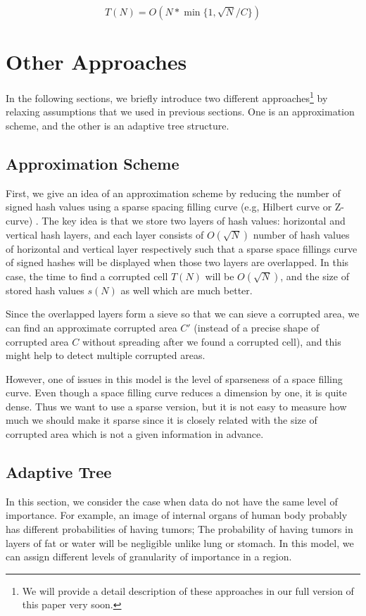 \documentclass{llncs}
\begin{document}
$$T(N) = O( N * \min \{ 1 , \sqrt{N}/C \} )$$

\section{Other Approaches}
\label{OtherApproaches}
In the following sections, we briefly introduce two different approaches\footnote{We will provide a detail description of these approaches in our full version of this paper very soon.} by relaxing assumptions that we used in previous sections.
One is an approximation scheme, and the other is an adaptive tree structure.

\subsection{Approximation Scheme}
First, we give an idea of an approximation scheme 
by reducing the number of signed hash values 
using a sparse spacing filling curve (e.g, Hilbert curve or Z-curve) \cite{LiJe00,OrMa98}.
The key idea is that we store two layers of hash values: horizontal and vertical hash layers,
and each layer consists of $O(\sqrt{N})$ number of hash values of horizontal and vertical layer
respectively such that a sparse space fillings curve of signed hashes will be displayed 
when those two layers are overlapped.
In this case, the time to find a corrupted cell $T(N)$ will be $O(\sqrt{N})$, 
and the size of stored hash values $s(N)$ as well which are much better. 

Since the overlapped layers form a sieve so that we can sieve a corrupted area,
we can find an approximate corrupted area $C'$ 
(instead of a precise shape of corrupted area $C$ 
without spreading after we found a corrupted cell),
and this might help to detect multiple corrupted areas.

However, one of issues in this model is the level of sparseness of a space filling curve.
Even though a space filling curve reduces a dimension by one, it is quite dense. 
Thus we want to use a sparse version, 
but it is not easy to measure how much we should make it sparse 
since it is closely related with the size of corrupted area which is not a given information in advance.


\subsection{Adaptive Tree}

In this section, we consider the case when data do not have the same level of importance.
For example, an image of internal organs of human body probably has 
different probabilities of having tumors; 
The probability of having tumors in layers of fat or water will be negligible
unlike lung or stomach.  
In this model, we can assign different levels of granularity of importance in a region.
\end{document}
